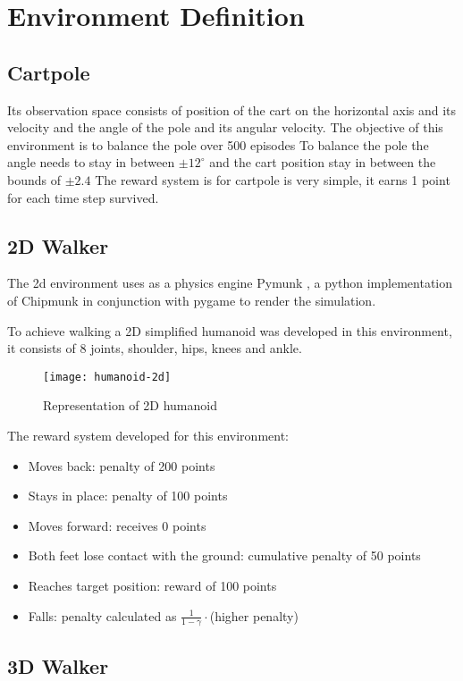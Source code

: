 \section{Environment Definition}


\subsection{Cartpole}
Its observation space consists of position of the cart on the horizontal axis and its velocity and the angle of the pole and its angular velocity.
The objective of this environment is to balance the pole over 500 episodes
To balance the pole the angle needs to stay in between $\pm12^\circ$ and the cart position stay in between the bounds of $\pm2.4$
The reward system is for cartpole is very simple, it earns 1 point for each time step survived.
\cite{cartpole}

\subsection{2D Walker}
The 2d environment uses as a physics engine Pymunk \cite{pymunk}, a python implementation of Chipmunk\cite{chipmunk} 
in conjunction with pygame \cite{pygame} to render the simulation. 

To achieve walking a 2D simplified humanoid was developed in this environment, it consists of 8 joints, shoulder, hips, knees and ankle.
\begin{figure}[h]
    \centering
    \texttt{[image: humanoid-2d]}
    \caption{Representation of 2D humanoid}
\end{figure}

The reward system developed for this environment:
\begin{itemize}
    \item Moves back: penalty of 200 points
    \item Stays in place: penalty of 100 points
    \item Moves forward: receives 0 points
    \item Both feet lose contact with the ground: cumulative penalty of 50 points
    \item Reaches target position: reward of 100 points
    \item Falls: penalty calculated as $\frac{1}{1-\gamma}\cdot$(higher penalty) 
\end{itemize}

\subsection{3D Walker}

\cite{ros-gym}
